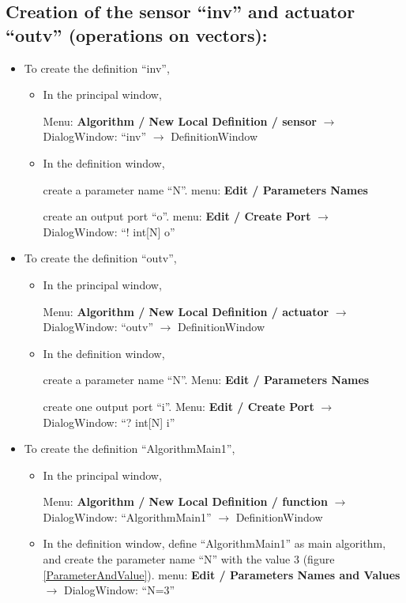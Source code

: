 \documentclass[a4paper,twoside]{report}
\begin{document}
\subsection{Creation of the sensor ``inv'' and actuator ``outv'' (operations on
vectors):}
\begin{itemize}
\item To create the definition ``inv'',
\begin{itemize}
\item In the principal window,

Menu: \textbf{Algorithm / New Local Definition / sensor} $\rightarrow$
DialogWindow: ``inv'' $\rightarrow$ DefinitionWindow

\item In the definition window,

create a parameter name ``N''. menu: \textbf{Edit / Parameters Names}

create an output port ``o''. menu: \textbf{Edit / Create Port} $\rightarrow$
DialogWindow: ``! int[N] o''
\end{itemize}

\item To create the definition ``outv'',
\begin{itemize}
\item In the principal window,

Menu: \textbf{Algorithm / New Local Definition / actuator} $\rightarrow$
DialogWindow: ``outv'' $\rightarrow$ DefinitionWindow

\item In the definition window,

create a parameter name ``N''. Menu: \textbf{Edit / Parameters Names}

create one output port ``i''. Menu: \textbf{Edit / Create Port} $\rightarrow$
DialogWindow: ``? int[N] i''
\end{itemize}

\item To create the definition ``AlgorithmMain1'',
\begin{itemize}
\item In the principal window,

Menu: \textbf{Algorithm / New Local Definition / function} $\rightarrow$
DialogWindow: ``AlgorithmMain1'' $\rightarrow$ DefinitionWindow

\item In the definition window, define ``AlgorithmMain1'' as main algorithm,
  and create the parameter name ``N'' with the value 3 (figure
\ref{ParameterAndValue}). menu: \textbf{Edit / Parameters Names and Values}
$\rightarrow$ DialogWindow: ``N=3''
\end{itemize}


\end{itemize}
\end{document}
